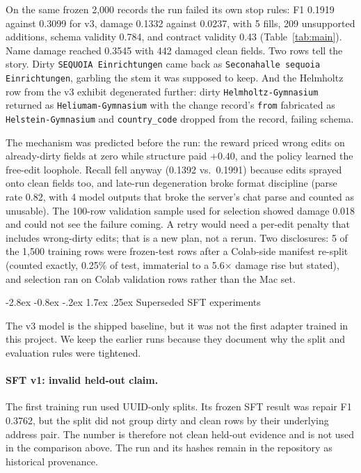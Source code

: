 \documentclass[11pt]{article}
\makeatletter
\renewcommand\section{\@startsection{section}{1}{\z@}%
  {-2.8ex \@plus -0.8ex \@minus -.2ex}%
  {1.7ex \@plus .25ex}%
  {\normalfont\Large\bfseries}}
\makeatother
\begin{document}
On the same frozen 2,000 records the run failed its own stop rules:
F1 0.1919 against 0.3099 for v3, damage 0.1332 against 0.0237, with 5
fills, 209 unsupported additions, schema validity 0.784, and contract
validity 0.43 (Table~\ref{tab:main}). Name damage reached 0.3545 with
442 damaged clean fields. Two rows tell the story. Dirty
\texttt{SEQUOIA Einrichtungen} came back as \texttt{Seconahalle
sequoia Einrichtungen}, garbling the stem it was supposed to keep.
And the Helmholtz row from the v3 exhibit degenerated further: dirty
\texttt{Helmholtz-Gymnasium} returned as \texttt{Heliumam-Gymnasium}
with the change record's \texttt{from} fabricated as
\texttt{Helstein-Gymnasium} and \texttt{country\_code} dropped from the
record, failing schema.

The mechanism was predicted before the run: the reward priced wrong
edits on already-dirty fields at zero while structure paid $+0.40$,
and the policy learned the free-edit loophole. Recall fell anyway
(0.1392 vs.\ 0.1991) because edits sprayed onto clean fields too, and
late-run degeneration broke format discipline (parse rate 0.82, with
4 model outputs that broke the server's chat parse and counted as
unusable). The 100-row validation sample used for selection showed
damage 0.018 and could not see the failure coming. A retry would need
a per-edit penalty that includes wrong-dirty edits; that is a new
plan, not a rerun. Two disclosures: 5 of the 1,500 training rows were
frozen-test rows after a Colab-side manifest re-split (counted exactly,
0.25\% of test, immaterial to a 5.6$\times$ damage rise but stated),
and selection ran on Colab validation rows rather than the Mac set.

\section{Superseded SFT experiments}
\label{sec:superseded}

The v3 model is the shipped baseline, but it was not the first adapter
trained in this project. We keep the earlier runs because they document
why the split and evaluation rules were tightened.

\paragraph{SFT v1: invalid held-out claim.} The first training run used
UUID-only splits. Its frozen SFT result was repair F1 0.3762, but the
split did not group dirty and clean rows by their underlying address
pair. The number is therefore not clean held-out evidence and is not
used in the comparison above. The run and its hashes remain in the
repository as historical provenance.
\end{document}
